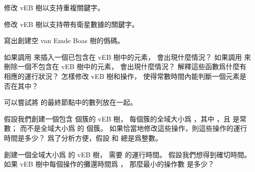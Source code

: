 \startsection[
  title={The van Emde Boas tree},
]

\startEXERCISE
修改 vEB 樹以支持重複關鍵字。
\stopEXERCISE

\startANSWER
{}
\stopANSWER

\startEXERCISE
修改 vEB 樹以支持帶有衛星數據的關鍵字。
\stopEXERCISE

\startANSWER
{}
\stopANSWER

\startEXERCISE
寫出創建空 van Emde Boas 樹的僞碼。
\stopEXERCISE

\startANSWER
{}
\stopANSWER

\startEXERCISE
如果調用  來插入一個已包含在 vEB 樹中的元素，
會出現什麼情況？
如果調用  來刪除一個不包含在 vEB 樹中的元素，
會出現什麼情況？
解釋這些函數爲什麼有相應的運行狀況？
怎樣修改 vEB 樹和操作，
使得常數時間內能判斷一個元素是否在其中？
\stopEXERCISE

\startANSWER
可以嘗試將  的最終節點中的數列放在一起。
\stopANSWER

\startEXERCISE
假設我們創建一個包含  個簇的 vEB 樹，
每個簇的全域大小爲 ，其中 ，且  是常數；
而不是全域大小爲  的  個簇。
如果恰當地修改這些操作，則這些操作的運行時間是多少？
爲了分析方便，假設  和  總是爲整數。
\stopEXERCISE

\startANSWER
{}
\stopANSWER

\startEXERCISE
創建一個全域大小爲  的 vEB 樹，
需要  的運行時間。
假設我們想得到確切時間。
如果 vEB 樹中每個操作的攤還時間爲 ，
那麼最小的操作數  是多少？
\stopEXERCISE

\startANSWER
{}
\stopANSWER

\stopsection
